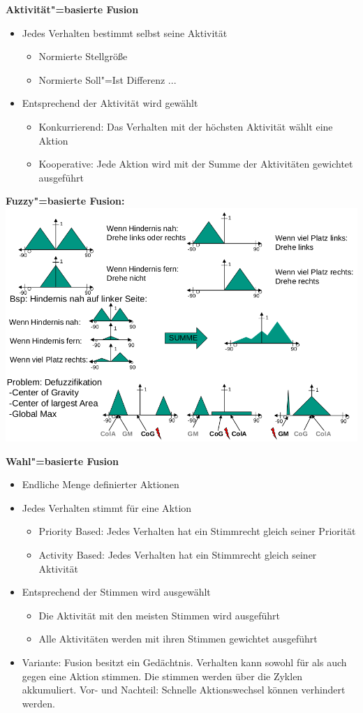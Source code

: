 \textbf{Aktivität"=basierte Fusion}
\begin{itemize}
	\item Jedes Verhalten bestimmt selbst seine Aktivität
	\begin{itemize}
		\item Normierte Stellgröße
		\item Normierte Soll"=Ist Differenz ...
	\end{itemize}
	\item Entsprechend der Aktivität wird gewählt
	\begin{itemize}
		\item Konkurrierend: Das Verhalten mit der höchsten Aktivität wählt eine Aktion
		\item Kooperative: Jede Aktion wird mit der Summe der Aktivitäten gewichtet ausgeführt
	\end{itemize}
\end{itemize}

\textbf{Fuzzy"=basierte Fusion:}\\
\includegraphics[width=.8\textwidth]{figures/fuzzy_based.png}

\textbf{Wahl"=basierte Fusion}
\begin{itemize}
	\item Endliche Menge definierter Aktionen
	\item Jedes Verhalten stimmt für eine Aktion
	\begin{itemize}
		\item Priority Based: Jedes Verhalten hat ein Stimmrecht gleich seiner Priorität
		\item Activity Based: Jedes Verhalten hat ein Stimmrecht gleich seiner Aktivität
	\end{itemize}
	\item Entsprechend der Stimmen wird ausgewählt
	\begin{itemize}
		\item Die Aktivität mit den meisten Stimmen wird ausgeführt
		\item Alle Aktivitäten werden mit ihren Stimmen gewichtet ausgeführt
	\end{itemize}
	\item Variante: Fusion besitzt ein Gedächtnis. Verhalten kann sowohl für als auch gegen eine Aktion stimmen. Die stimmen werden über die Zyklen akkumuliert. Vor- und Nachteil: Schnelle Aktionswechsel können verhindert werden.
\end{itemize}

